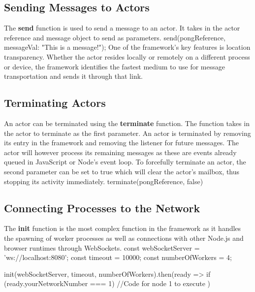\documentclass[12pt, a4paper]{report}
\newenvironment{code}
{\footnotesize\verbatim}{\endverbatim\normalfont}
\theoremstyle{definition}
\theoremstyle{definition}%
\theoremstyle{definition}%
\theoremstyle{definition}%
\theoremstyle{definition}%
\theoremstyle{definition}%
\begin{document}
\subsection{Sending Messages to Actors}
The \textbf{send} function is used to send a message to an actor. It takes in the actor reference and message object to send as parameters.
\begin{code}
send(pongReference, {messageVal: "This is a message!"});
\end{code}
One of the framework's key features is location transparency. Whether the actor resides locally or remotely on a different process or device, the framework identifies the fastest medium to use for message transportation and sends it through that link.
\subsection{Terminating Actors}
An actor can be terminated using the \textbf{terminate} function. The function takes in the actor to terminate as the first parameter. An actor is terminated by removing its entry in the framework and removing the listener for future messages. The actor will however process its remaining messages as these are events already queued in JavaScript or Node's event loop. To forcefully terminate an actor, the second parameter can be set to true which will clear the actor's mailbox, thus stopping its activity immediately.
\begin{code}
terminate(pongReference, false)
\end{code}
\subsection{Connecting Processes to the Network}
The \textbf{init} function is the most complex function in the framework as it handles the spawning of worker processes as well as connections with other Node.js and browser runtimes through WebSockets.
\begin{code}
const webSocketServer = 'ws://localhost:8080';
const timeout = 10000;
const numberOfWorkers = 4;

init(webSocketServer, timeout, numberOfWorkers).then(ready => {
    if (ready.yourNetworkNumber === 1) {
        //Code for node 1 to execute
    }
})
\end{code}
 
\end{document}
